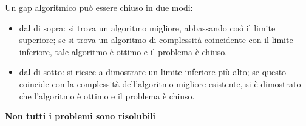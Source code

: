 \documentclass[12pt]{article}
\begin{document}
Un gap algoritmico può essere chiuso in due modi:
\begin{itemize}
    \setlength\itemsep{0em}
    \item dal di sopra: si trova un algoritmo migliore, abbassando così il limite superiore; se si trova un algoritmo di complessità coincidente con il limite inferiore, tale algoritmo è ottimo e il problema è chiuso.
    \item dal di sotto: si riesce a dimostrare un limite inferiore più alto; se questo coincide con la complessità dell'algoritmo migliore esistente, si è dimostrato che l'algoritmo è ottimo e il problema è chiuso.
\end{itemize}
\textbf{Non tutti i problemi sono risolubili}
\end{document}
